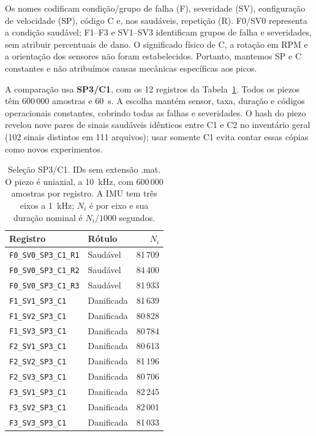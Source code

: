 \documentclass[conference,a4paper]{IEEEtran}
\begin{document}
Os nomes codificam condição/grupo de falha (F), severidade (SV), configuração de velocidade (SP), código C e, nos saudáveis, repetição (R). F0/SV0 representa a condição saudável; F1--F3 e SV1--SV3 identificam grupos de falha e severidades, sem atribuir percentuais de dano. O significado físico de C, a rotação em RPM e a orientação dos sensores não foram estabelecidos. Portanto, mantemos SP e C constantes e não atribuímos causas mecânicas específicas aos picos.

A comparação usa \textbf{SP3/C1}, com os 12 registros da Tabela~\ref{tab:registros}. Todos os piezos têm 600\,000 amostras e 60~s. A escolha mantém sensor, taxa, duração e códigos operacionais constantes, cobrindo todas as falhas e severidades. O hash do piezo revelou nove pares de sinais saudáveis idênticos entre C1 e C2 no inventário geral (102 sinais distintos em 111 arquivos); usar somente C1 evita contar essas cópias como novos experimentos.

\begin{table}[!ht]
\caption{Seleção SP3/C1. IDs sem extensão .mat. O piezo é uniaxial, a 10~kHz, com 600\,000 amostras por registro. A IMU tem três eixos a 1~kHz; $N_i$ é por eixo e sua duração nominal é $N_i/1000$ segundos.}
\label{tab:registros}\centering\footnotesize\setlength{\tabcolsep}{4pt}
\begin{tabular}{@{}llr@{}}\toprule
Registro & Rótulo & $N_i$\\\midrule
\texttt{F0\_SV0\_SP3\_C1\_R1} & Saudável & 81\,709\\
\texttt{F0\_SV0\_SP3\_C1\_R2} & Saudável & 84\,400\\
\texttt{F0\_SV0\_SP3\_C1\_R3} & Saudável & 81\,933\\
\texttt{F1\_SV1\_SP3\_C1} & Danificada & 81\,639\\
\texttt{F1\_SV2\_SP3\_C1} & Danificada & 80\,828\\
\texttt{F1\_SV3\_SP3\_C1} & Danificada & 80\,784\\
\texttt{F2\_SV1\_SP3\_C1} & Danificada & 80\,613\\
\texttt{F2\_SV2\_SP3\_C1} & Danificada & 81\,196\\
\texttt{F2\_SV3\_SP3\_C1} & Danificada & 80\,706\\
\texttt{F3\_SV1\_SP3\_C1} & Danificada & 82\,245\\
\texttt{F3\_SV2\_SP3\_C1} & Danificada & 82\,001\\
\texttt{F3\_SV3\_SP3\_C1} & Danificada & 81\,033\\\bottomrule
\end{tabular}
\end{table}
\end{document}
